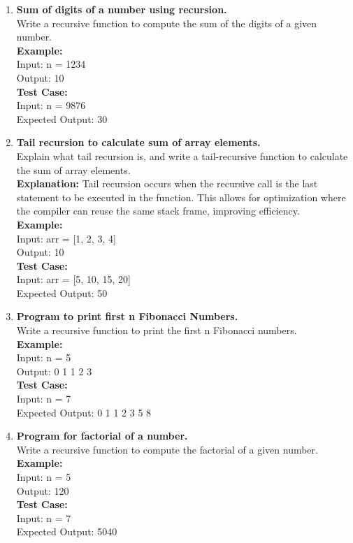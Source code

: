 \documentclass[12pt]{article}
\begin{document}
\begin{enumerate}
    \item \textbf{Sum of digits of a number using recursion.} \\
    Write a recursive function to compute the sum of the digits of a given number. \\
    \textbf{Example:} \\
    Input: n = 1234 \\
    Output: 10 \\
    \textbf{Test Case:} \\
    Input: n = 9876 \\
    Expected Output: 30
    
    \item \textbf{Tail recursion to calculate sum of array elements.} \\
    Explain what tail recursion is, and write a tail-recursive function to calculate the sum of array elements. \\
    \textbf{Explanation:} Tail recursion occurs when the recursive call is the last statement to be executed in the function. This allows for optimization where the compiler can reuse the same stack frame, improving efficiency. \\
    \textbf{Example:} \\
    Input: arr = [1, 2, 3, 4] \\
    Output: 10 \\
    \textbf{Test Case:} \\
    Input: arr = [5, 10, 15, 20] \\
    Expected Output: 50
    
    \item \textbf{Program to print first n Fibonacci Numbers.} \\
    Write a recursive function to print the first n Fibonacci numbers. \\
    \textbf{Example:} \\
    Input: n = 5 \\
    Output: 0 1 1 2 3 \\
    \textbf{Test Case:} \\
    Input: n = 7 \\
    Expected Output: 0 1 1 2 3 5 8
    
    \item \textbf{Program for factorial of a number.} \\
    Write a recursive function to compute the factorial of a given number. \\
    \textbf{Example:} \\
    Input: n = 5 \\
    Output: 120 \\
    \textbf{Test Case:} \\
    Input: n = 7 \\
    Expected Output: 5040
    

\end{enumerate}
\end{document}
